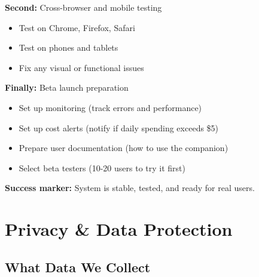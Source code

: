 \documentclass[12pt,a4paper]{article}
\begin{document}
\textbf{Second:} Cross-browser and mobile testing
\begin{itemize}
  \item Test on Chrome, Firefox, Safari
  \item Test on phones and tablets
  \item Fix any visual or functional issues
\end{itemize}

\textbf{Finally:} Beta launch preparation
\begin{itemize}
  \item Set up monitoring (track errors and performance)
  \item Set up cost alerts (notify if daily spending exceeds \$5)
  \item Prepare user documentation (how to use the companion)
  \item Select beta testers (10-20 users to try it first)
\end{itemize}

\textbf{Success marker:} System is stable, tested, and ready for real users.

\section{Privacy \& Data Protection}

\subsection{What Data We Collect}
\end{document}

